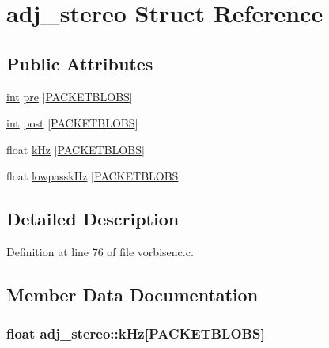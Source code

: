 \hypertarget{structadj__stereo}{}\section{adj\+\_\+stereo Struct Reference}
\label{structadj__stereo}
\subsection*{Public Attributes}
\begin{DoxyCompactItemize}
\item 
\hyperlink{xmltok_8h_a5a0d4a5641ce434f1d23533f2b2e6653}{int} \hyperlink{structadj__stereo_a407eb6cd5c50925e4430031d365f075a}{pre} \mbox{[}\hyperlink{codec__internal_8h_a9293c5a15a78abadbe212d944080e04b}{P\+A\+C\+K\+E\+T\+B\+L\+O\+BS}\mbox{]}
\item 
\hyperlink{xmltok_8h_a5a0d4a5641ce434f1d23533f2b2e6653}{int} \hyperlink{structadj__stereo_a4b578638118067c75ffe2768921f1f9e}{post} \mbox{[}\hyperlink{codec__internal_8h_a9293c5a15a78abadbe212d944080e04b}{P\+A\+C\+K\+E\+T\+B\+L\+O\+BS}\mbox{]}
\item 
float \hyperlink{structadj__stereo_a13ef814e311be6be34a982e89141f8ed}{k\+Hz} \mbox{[}\hyperlink{codec__internal_8h_a9293c5a15a78abadbe212d944080e04b}{P\+A\+C\+K\+E\+T\+B\+L\+O\+BS}\mbox{]}
\item 
float \hyperlink{structadj__stereo_aff4713a11cb5a9d22a61a32f9b20c0d8}{lowpassk\+Hz} \mbox{[}\hyperlink{codec__internal_8h_a9293c5a15a78abadbe212d944080e04b}{P\+A\+C\+K\+E\+T\+B\+L\+O\+BS}\mbox{]}
\end{DoxyCompactItemize}


\subsection{Detailed Description}


Definition at line 76 of file vorbisenc.\+c.



\subsection{Member Data Documentation}
\subsubsection[{\texorpdfstring{k\+Hz}{kHz}}]{\setlength{\rightskip}{0pt plus 5cm}float adj\+\_\+stereo\+::k\+Hz\mbox{[}{\bf P\+A\+C\+K\+E\+T\+B\+L\+O\+BS}\mbox{]}}\hypertarget{structadj__stereo_a13ef814e311be6be34a982e89141f8ed}{}\label{structadj__stereo_a13ef814e311be6be34a982e89141f8ed}



